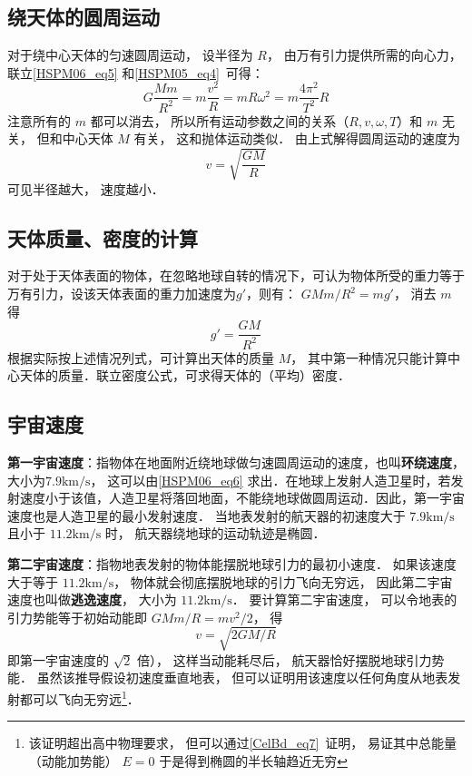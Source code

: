 \subsection{绕天体的圆周运动}

对于绕中心天体的匀速圆周运动， 设半径为 $R$， 由万有引力提供所需的向心力， 联立\autoref{HSPM06_eq5} 和\autoref{HSPM05_eq4}~可得：
\begin{equation}
G\frac{Mm}{R^2}=m\frac{v^2}{R}=mR\omega^2=m\frac{4\pi^2}{T^2}R
\end{equation}
注意所有的 $m$ 都可以消去， 所以所有运动参数之间的关系（$R,v,\omega,T$）和 $m$ 无关， 但和中心天体 $M$ 有关， 这和抛体运动类似． 由上式解得圆周运动的速度为
\begin{equation}\label{HSPM06_eq6}
v = \sqrt{\frac{GM}{R}}
\end{equation}
可见半径越大， 速度越小．

\subsection{天体质量、密度的计算}

对于处于天体表面的物体，在忽略地球自转的情况下，可认为物体所受的重力等于万有引力，设该天体表面的重力加速度为$g'$，则有： $GMm/R^2=mg'$， 消去 $m$ 得
\begin{equation}
g' = \frac{GM}{R^2}
\end{equation}
根据实际按上述情况列式，可计算出天体的质量 $M$， 其中第一种情况只能计算中心天体的质量．联立密度公式，可求得天体的（平均）密度．

\subsection{宇宙速度}

\textbf{第一宇宙速度}：指物体在地面附近绕地球做匀速圆周运动的速度，也叫\textbf{环绕速度}，大小为$7.9\mathrm{km/s}$， 这可以由\autoref{HSPM06_eq6} 求出．在地球上发射人造卫星时，若发射速度小于该值，人造卫星将落回地面，不能绕地球做圆周运动．因此，第一宇宙速度也是人造卫星的最小发射速度． 当地表发射的航天器的初速度大于 $7.9\mathrm{km/s}$ 且小于 $11.2\mathrm{km/s}$ 时， 航天器绕地球的运动轨迹是椭圆．

\textbf{第二宇宙速度}：指物地表发射的物体能摆脱地球引力的最初小速度． 如果该速度大于等于 $11.2\mathrm{km/s}$， 物体就会彻底摆脱地球的引力飞向无穷远， 因此第二宇宙速度也叫做\textbf{逃逸速度}， 大小为 $11.2\mathrm{km/s}$． 要计算第二宇宙速度， 可以令地表的引力势能等于初始动能即 $GMm/R = mv^2/2$， 得
\begin{equation}
v = \sqrt{2GM/R}
\end{equation}
即第一宇宙速度的 $\sqrt{2}$ 倍）， 这样当动能耗尽后， 航天器恰好摆脱地球引力势能． 虽然该推导假设初速度垂直地表， 但可以证明用该速度以任何角度从地表发射都可以飞向无穷远\footnote{该证明超出高中物理要求， 但可以通过\autoref{CelBd_eq7}~证明， 易证其中总能量（动能加势能） $E = 0$ 于是得到椭圆的半长轴趋近无穷}．

